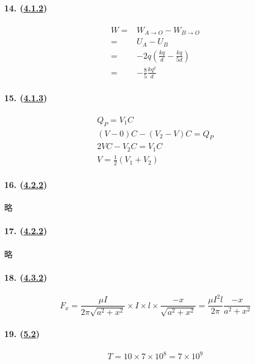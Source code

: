 \paragraph{14. (\hyperref[subsec:4.1.2]{4.1.2})}

\begin{align*}
    W=&W_{A\to O}-W_{B\to O}\\
    =&U_A-U_B\\
    =&-2q\left(\frac{kq}{d}-\frac{kq}{5d}\right)\\
    =&-\frac85\frac{kq^2}{d}
\end{align*}

\paragraph{15. (\hyperref[subsec:4.1.3]{4.1.3})}

\begin{gather*}
    Q_P=V_1C\\
    (V-0)C-(V_2-V)C=Q_P\\
    2VC-V_2C=V_1C\\
    V=\frac12(V_1+V_2)
\end{gather*}

\paragraph{16. (\hyperref[subsec:4.2.2]{4.2.2})} 略
\paragraph{17. (\hyperref[subsec:4.2.2]{4.2.2})} 略
\paragraph{18. (\hyperref[subsec:4.3.2]{4.3.2})}

\begin{equation*}
    F_x=\frac{\mu I}{2\pi\sqrt{a^2+x^2}}\times I\times l\times\frac{-x}{\sqrt{a^2+x^2}}=\frac{\mu I^2l}{2\pi}\frac{-x}{a^2+x^2}
\end{equation*}

\paragraph{19. (\hyperref[sec:5.2]{5.2})}

\begin{equation*}
    T=10\times7\times10^8=7\times10^9
\end{equation*}
